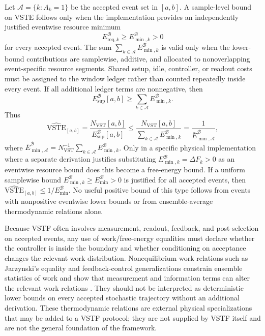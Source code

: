 \documentclass[11pt,a4paper]{article}
\newcommand{\VST}{\ensuremath{\mathrm{VST}}}
\newcommand{\VSTE}{\ensuremath{\mathrm{VSTE}}}
\newcommand{\1}{\mathbf{1}}
\begin{document}
Let $\mathcal{A}=\{k:A_k=1\}$ be the accepted event set in $[a,b]$. A sample-level bound on \VSTE{} follows only when the implementation provides an independently justified eventwise resource minimum
\[
  E_{\mathrm{req},k}^{\mathcal{B}}\geq E_{\min,k}^{\mathcal{B}}>0
\]
for every accepted event. The sum $\sum_{k\in\mathcal{A}}E_{\min,k}^{\mathcal{B}}$ is valid only when the lower-bound contributions are samplewise, additive, and allocated to nonoverlapping event-specific resource segments. Shared setup, idle, controller, or readout costs must be assigned to the window ledger rather than counted repeatedly inside every event. If all additional ledger terms are nonnegative, then
\[
  E_{\mathrm{sup}}^{\mathcal{B}}[a,b]\geq \sum_{k\in\mathcal{A}}E_{\min,k}^{\mathcal{B}}.
\]
Thus
\[
  \widehat{\VSTE}_{[a,b]}
  =
  \frac{N_{\VST}[a,b]}{E_{\mathrm{sup}}^{\mathcal{B}}[a,b]}
  \leq
  \frac{N_{\VST}[a,b]}{\sum_{k\in\mathcal{A}}E_{\min,k}^{\mathcal{B}}}
  =
  \frac{1}{\bar{E}_{\min,\mathcal{A}}^{\mathcal{B}}},
\]
where $\bar{E}_{\min,\mathcal{A}}^{\mathcal{B}}=N_{\VST}^{-1}\sum_{k\in\mathcal{A}}E_{\min,k}^{\mathcal{B}}$. Only in a specific physical implementation where a separate derivation justifies substituting $E_{\min,k}^{\mathcal{B}}=\Delta F_k>0$ as an eventwise resource bound does this become a free-energy bound. If a uniform samplewise bound $E_{\min,k}^{\mathcal{B}}\geq E_{\min}^{\mathcal{B}}>0$ is justified for all accepted events, then $\widehat{\VSTE}_{[a,b]}\leq 1/E_{\min}^{\mathcal{B}}$. No useful positive bound of this type follows from events with nonpositive eventwise lower bounds or from ensemble-average thermodynamic relations alone.

Because VSTF often involves measurement, readout, feedback, and post-selection on accepted events, any use of work/free-energy equalities must declare whether the controller is inside the boundary and whether conditioning on acceptance changes the relevant work distribution. Nonequilibrium work relations such as Jarzynski's equality and feedback-control generalizations constrain ensemble statistics of work and show that measurement and information terms can alter the relevant work relations \cite{jarzynski1997,sagawa2010}. They should not be interpreted as deterministic lower bounds on every accepted stochastic trajectory without an additional derivation. These thermodynamic relations are external physical specializations that may be added to a VSTF protocol; they are not supplied by VSTF itself and are not the general foundation of the framework.
\end{document}
